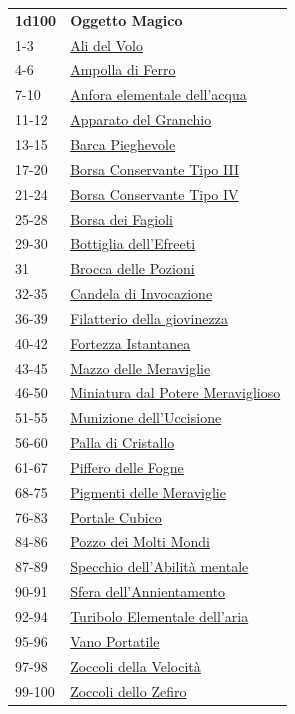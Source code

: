 \begin{multicols}{2}
{{\small\begin{tabularx}{0.45\textwidth}{lX}
\textbf{1d100} & \textbf{Oggetto Magico}\\
1-3 & \hyperlink{AlidelVolo}{Ali del Volo}\\
4-6 & \hyperlink{AmpolladiFerro}{Ampolla di Ferro}\\
7-10 & \hyperlink{Anforaelementaledell'acqua}{Anfora elementale dell'acqua}\\
11-12 & \hyperlink{ApparatodelGranchio}{Apparato del Granchio}\\
13-15 & \hyperlink{BarcaPieghevole}{Barca Pieghevole}\\
17-20 & \hyperlink{BorsaConservanteTipoIII}{Borsa Conservante Tipo III}\\
21-24 & \hyperlink{BorsaConservanteTipoIV}{Borsa Conservante Tipo IV}\\
25-28 & \hyperlink{BorsadeiFagioli}{Borsa dei Fagioli}\\
29-30 & \hyperlink{Bottigliadell'Efreeti}{Bottiglia dell'Efreeti}\\
31 & \hyperlink{BroccadellePozioni}{Brocca delle Pozioni}\\
32-35 & \hyperlink{CandeladiInvocazione}{Candela di Invocazione}\\
36-39 & \hyperlink{Filatteriodellagiovinezza}{Filatterio della giovinezza}\\
40-42 & \hyperlink{FortezzaIstantanea}{Fortezza Istantanea}\\
43-45 & \hyperlink{MazzodelleMeraviglie}{Mazzo delle Meraviglie}\\
46-50 & \hyperlink{Miniatura dal Potere Meraviglioso}{Miniatura dal Potere Meraviglioso}\\
51-55 & \hyperlink{Munizionedell'Uccisione}{Munizione dell'Uccisione}\\
56-60 & \hyperlink{PalladiCristallo}{Palla di Cristallo}\\
61-67 & \hyperlink{PifferodelleFogne}{Piffero delle Fogne}\\
68-75 & \hyperlink{PigmentidelleMeraviglie}{Pigmenti delle Meraviglie}\\
76-83 & \hyperlink{PortaleCubico}{Portale Cubico}\\
84-86 & \hyperlink{PozzodeiMoltiMondi}{Pozzo dei Molti Mondi}\\
87-89 & \hyperlink{Specchio dell'Abilità mentale}{Specchio dell'Abilità mentale}\\
90-91 & \hyperlink{Sferadell'Annientamento}{Sfera dell'Annientamento}\\
92-94 & \hyperlink{TuriboloElementaledell'aria}{Turibolo Elementale dell'aria}\\
95-96 & \hyperlink{VanoPortatile}{Vano Portatile}\\
97-98 & \hyperlink{ZoccolidellaVelocità}{Zoccoli della Velocità}\\
99-100 & \hyperlink{ZoccolidelloZefiro}{Zoccoli dello Zefiro}
\end{tabularx}}

}
\end{multicols}
